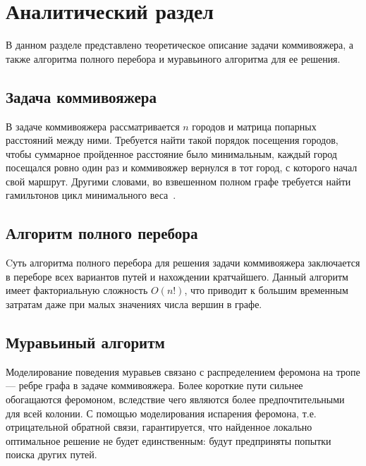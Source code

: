 \section{Аналитический раздел \hfill}
\vspace{\baselineskip}

В данном разделе представлено теоретическое описание задачи коммивояжера, а также алгоритма полного перебора и муравьиного алгоритма для ее решения.

\vspace{\baselineskip}
\subsection{Задача коммивояжера}
\vspace{\baselineskip}

В задаче коммивояжера рассматривается $n$ городов и матрица попарных расстояний между ними. 
Требуется найти такой порядок посещения городов, чтобы  суммарное пройденное расстояние было минимальным, каждый город посещался ровно один раз и коммивояжер вернулся в тот город, с которого начал свой маршрут.  
Другими словами, во взвешенном полном графе требуется найти гамильтонов цикл минимального веса~\cite{salesman}. 

\vspace{\baselineskip}
\subsection{Алгоритм полного перебора}
\vspace{\baselineskip}

Cуть алгоритма полного перебора для решения задачи коммивояжера заключается в переборе всех вариантов путей и нахождении кратчайшего.
Данный алгоритм имеет факториальную сложность $O(n!)$, что приводит к большим временным затратам даже при малых значениях числа вершин в графе.

\vspace{\baselineskip}
\subsection{Муравьиный алгоритм}
\vspace{\baselineskip}

Моделирование поведения муравьев связано с распределением феромона на тропе --- ребре графа в задаче коммивояжера. 
Более короткие пути сильнее обогащаются феромоном, вследствие чего являются более предпочтительными для всей колонии.
С помощью моделирования испарения феромона, т.е. отрицательной обратной связи, гарантируется, что найденное локально оптимальное решение не будет единственным: будут предприняты попытки поиска других путей.

